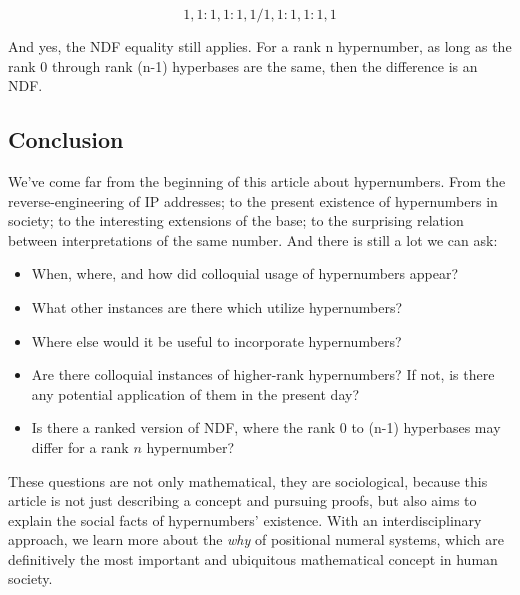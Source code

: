 \documentclass{article}
\begin{document}
$$1,1:1,1:1,1/1,1:1,1:1,1$$

\noindent And yes, the NDF equality still applies. For a rank n hypernumber, as long as the rank 0 through rank (n-1) hyperbases are the same, then the difference is an NDF.

\subsection*{Conclusion}

We've come far from the beginning of this article about hypernumbers. From the reverse-engineering of IP addresses; to the present existence of hypernumbers in society; to the interesting extensions of the base; to the surprising relation between interpretations of the same number. And there is still a lot we can ask:

\begin{itemize}
\item When, where, and how did colloquial usage of hypernumbers appear?
\item What other instances are there which utilize hypernumbers?
\item Where else would it be useful to incorporate hypernumbers?
\item Are there colloquial instances of higher-rank hypernumbers? If not, is there any potential application of them in the present day?
\item Is there a ranked version of NDF, where the rank 0 to (n-1) hyperbases may differ for a rank $n$ hypernumber?
\end{itemize}

\noindent These questions are not only mathematical, they are sociological, because this article is not just describing a concept and pursuing proofs, but also aims to explain the social facts of hypernumbers' existence. With an interdisciplinary approach, we learn more about the \textit{why} of positional numeral systems, which are definitively the most important and ubiquitous mathematical concept in human society.
\end{document}
